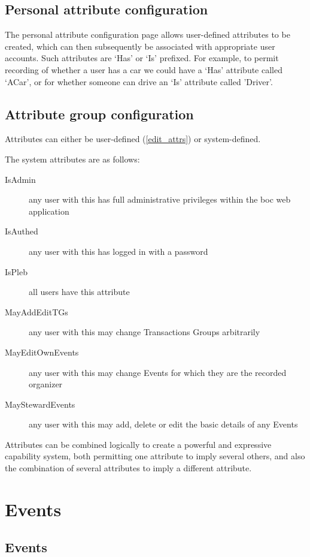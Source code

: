 \documentclass{report}
\begin{document}
\subsection{Personal attribute configuration}\label{edit_attrs}

The personal attribute configuration page allows user-defined attributes to be created, which can then subsequently be associated with appropriate user accounts.  Such attributes are `Has' or `Is' prefixed.  For example, to permit recording of whether a user has a car we could have a `Has' attribute called `ACar', or for whether someone can drive an `Is' attribute called 'Driver'.

\subsection{Attribute group configuration}\label{attr_groups}

Attributes can either be user-defined (\autoref{edit_attrs}) or system-defined.

The system attributes are as follows:

\begin{description}
\item[IsAdmin] any user with this has full administrative privileges within the boc web application
\item[IsAuthed] any user with this has logged in with a password
\item[IsPleb] all users have this attribute
\item[MayAddEditTGs] any user with this may change Transactions Groups arbitrarily
\item[MayEditOwnEvents] any user with this may change Events for which they are the recorded organizer
\item[MayStewardEvents] any user with this may add, delete or edit the basic details of any Events
\end{description}

Attributes can be combined logically to create a powerful and expressive capability system, both permitting one attribute to imply several others, and also the combination of several attributes to imply a different attribute.

\section{Events}

\subsection{Events}
\end{document}
